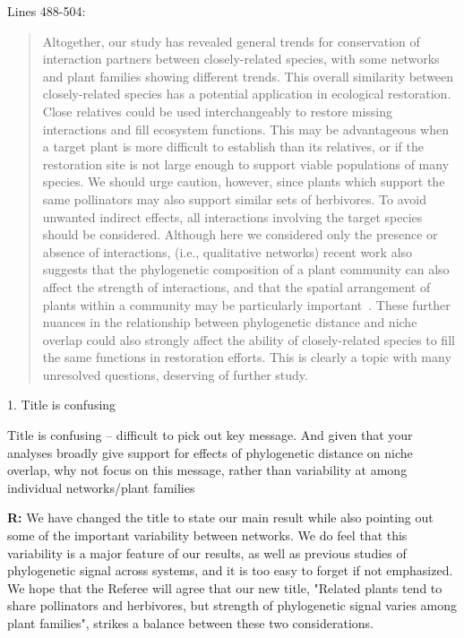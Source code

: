 \documentclass[12pt]{letter}
\newenvironment{refquote}{\bigskip \begin{it}}{\end{it}\smallskip}
\begin{document}
	Lines 488-504:

	\begin{quotation}

		Altogether, our study has revealed general trends for conservation of interaction
		partners between closely-related species, with some networks and plant 
		families showing different trends. This overall similarity between closely-related
		species has a potential application in ecological restoration. Close relatives could
		be used interchangeably to restore missing interactions and fill ecosystem functions. 
		This may be advantageous when a target plant is more difficult to establish than its
		relatives, or if the restoration site is not large enough to support viable populations 
		of many species. We should urge caution, however, since plants which support the
		same pollinators may also support similar sets of herbivores. To avoid unwanted 
		indirect effects, all interactions involving the target species should be considered.
		Although here we considered only the presence or absence of interactions,
		(i.e., qualitative networks)
		recent work also suggests that the phylogenetic composition of a plant
		community can also affect the strength of 
		interactions, and that the spatial arrangement of plants within a 
		community may be particularly important~\citep{Yguel2011,Castagneyrol2014}.
		These further nuances in the relationship between phylogenetic distance and 
		niche overlap could also strongly affect the ability of closely-related species to
		fill the same functions in restoration efforts. This is clearly a topic with many
		unresolved questions, deserving of further study.

	\end{quotation}


	1. Title is confusing

		\begin{refquote}
			Title is confusing – difficult to pick out key message. And given that your analyses broadly give support for effects of phylogenetic distance on niche overlap, why not focus on this message, rather than variability at among individual networks/plant families
		\end{refquote}


		\textbf{R:} We have changed the title to state our main result while also pointing out some of the important variability between networks. We do feel that this variability is a major feature of our results, as well as previous studies of phylogenetic signal across systems, and it is too easy to forget if not emphasized. We hope that the Referee will agree that our new title, "Related plants tend to share pollinators and herbivores, but strength of phylogenetic signal varies among plant families", strikes a balance between these two considerations.
\end{document}
